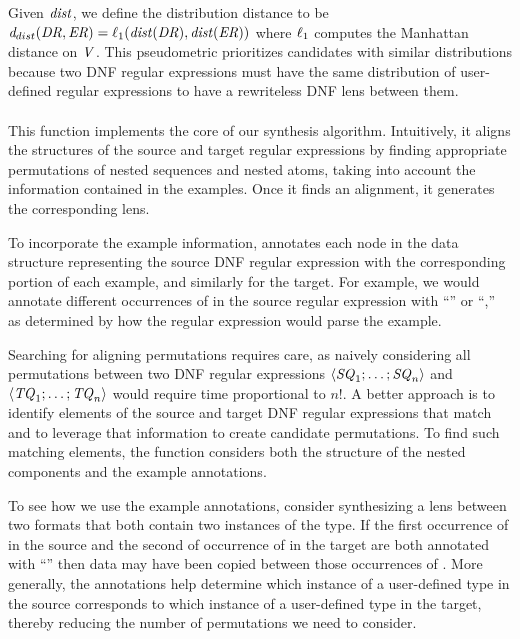 \documentclass[numbers,10pt,preprint\ifanon ,nocopyrightspace\fi]{sigplanconf}
\begin{document}
Given $\mathit{dist}$, we define the distribution distance to be
$\mathit{d}_{dist}(\mathit{DR},\mathit{ER})=
\ell_1(\mathit{dist}(\mathit{DR}),\mathit{dist}(\mathit{ER}))$
where $\ell_1$ computes the Manhattan distance on $\mathit{V}$.
This pseudometric prioritizes candidates with similar distributions
because two DNF regular expressions must have the same distribution of
user-defined regular expressions to have a rewriteless DNF lens
between them.


\paragraph*{\RigidSynth} 
This function implements the core of our synthesis algorithm.
Intuitively, it aligns the structures of the source and target regular
expressions by finding appropriate permutations of nested sequences
and nested atoms, taking into account the information contained in the
examples.  Once it finds an alignment, it generates the
corresponding lens. 

To incorporate the example information, \RigidSynth{} annotates each
node in the data structure representing the source DNF regular
expression with the corresponding portion of each example, and
similarly for the target.  For example, we would annotate
different occurrences of  in the source 
regular expression with ``'' or ``,'' as
determined by how the regular expression would parse the example. 

Searching for aligning permutations requires care, as naively
considering all permutations between two DNF regular
expressions $\langle\mathit{SQ}_1;\ldots;\mathit{SQ}_n\rangle$ and
$\langle\mathit{TQ}_1;\ldots;\mathit{TQ}_n\rangle$ would require time
proportional to $n!$.  A better approach is to identify elements of
the source and target DNF regular expressions that match and to
leverage that information to create candidate permutations.  To find
such matching elements, the function considers both the structure of
the nested components and the example annotations.  

To see how we use the example annotations, consider synthesizing a
lens between two formats that both contain two instances of the 
type.  If the first occurrence of  in the source
and the second of occurrence of  in the target are both
annotated with ``'' then data may have been copied between those 
occurrences of .  More generally, the annotations
help determine which instance of a user-defined type in the source corresponds 
to which instance of a user-defined type in the target, thereby
reducing the number of permutations we need to consider.
\end{document}
